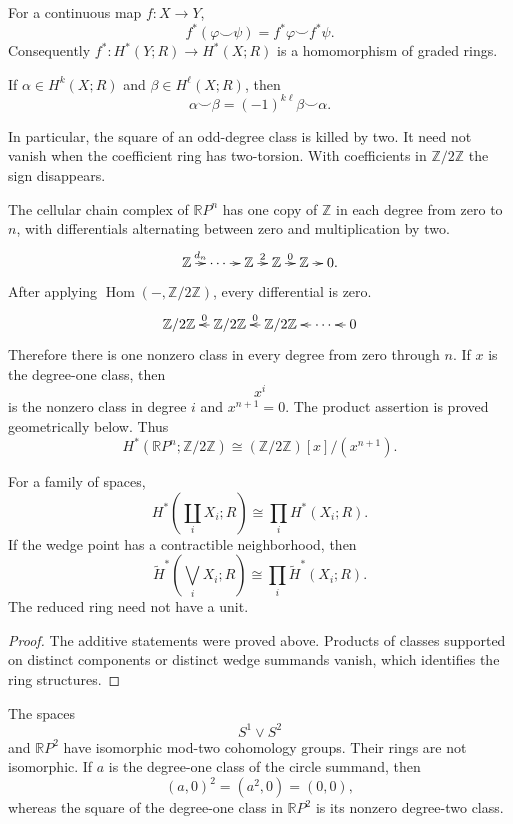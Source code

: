 \begin{proposition}
\label{at-proposition-cup-naturality}
For a continuous map $f:X\to Y$,
$$
f^*(\varphi\smile\psi)
=
f^*\varphi\smile f^*\psi.
$$
Consequently $f^*:H^*(Y;R)\to H^*(X;R)$
is a homomorphism of graded rings.
\end{proposition}

\begin{proposition}
\label{at-proposition-cup-commutativity}
If $\alpha\in H^k(X;R)$ and
$\beta\in H^\ell(X;R)$, then
$$
\alpha\smile\beta
=
(-1)^{k\ell}\beta\smile\alpha.
$$
\end{proposition}

\noindent
In particular, the square of an odd-degree
class is killed by two.  It need not vanish
when the coefficient ring has two-torsion.
With coefficients in
$\mathbb{Z}/2\mathbb{Z}$ the sign
disappears.

\begin{example}
\label{at-example-projective-mod-two-ring}
The cellular chain complex of
$\mathbb{R}P^n$ has one copy of
$\mathbb{Z}$ in each degree from zero to
$n$, with differentials alternating between
zero and multiplication by two.
$$
\xymatrix@C=.7em{
\mathbb{Z} \ar[r]^-{d_n}
  & \cdots \ar[r]
  & \mathbb{Z} \ar[r]^-2
  & \mathbb{Z} \ar[r]^-0
  & \mathbb{Z} \ar[r]
  & 0.
}
$$
After applying
$\operatorname{Hom}(-,
\mathbb{Z}/2\mathbb{Z})$, every
differential is zero.
$$
\xymatrix@C=.7em{
\mathbb{Z}/2\mathbb{Z}
  & \mathbb{Z}/2\mathbb{Z}
    \ar[l]_-0
  & \mathbb{Z}/2\mathbb{Z}
    \ar[l]_-0
  & \cdots \ar[l]
  & 0 \ar[l].
}
$$
Therefore there is one nonzero class in
every degree from zero through $n$.  If
$x$ is the degree-one class, then
$$
x^i
$$
is the nonzero class in degree $i$ and
$x^{n+1}=0$.  The product assertion is
proved geometrically below.  Thus
$$
H^*(\mathbb{R}P^n;
\mathbb{Z}/2\mathbb{Z})
\cong
(\mathbb{Z}/2\mathbb{Z})[x]/(x^{n+1}).
$$

\begin{proposition}
\label{at-proposition-cup-unions}
For a family of spaces,
$$
H^*\left(\coprod_iX_i;R\right)
\cong
\prod_iH^*(X_i;R).
$$
If the wedge point has a contractible
neighborhood, then
$$
\widetilde H^*\left(\bigvee_iX_i;R\right)
\cong
\prod_i\widetilde H^*(X_i;R).
$$
The reduced ring need not have a unit.
\end{proposition}

\begin{proof}
The additive statements were proved above.
Products of classes supported on distinct
components or distinct wedge summands
vanish, which identifies the ring
structures.
\end{proof}

\begin{example}
\label{at-example-wedge-projective-ring}
The spaces
$$
S^1\vee S^2
$$
and $\mathbb{R}P^2$ have isomorphic
mod-two cohomology groups.  Their rings are
not isomorphic.  If $a$ is the degree-one
class of the circle summand, then
$$
(a,0)^2=(a^2,0)=(0,0),
$$
whereas the square of the degree-one class
in $\mathbb{R}P^2$ is its nonzero
degree-two class.
\end{example}
\end{example}
